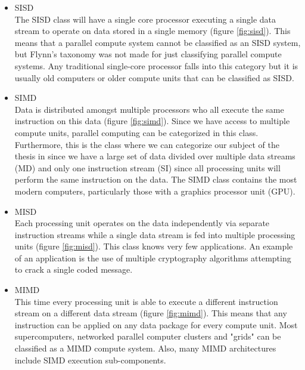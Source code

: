 \documentclass[a4paper, 11pt]{report}
\begin{document}
	\begin{itemize}
		\item SISD\\
		
The SISD class will have a single core processor executing a single data stream to operate on data stored in a single memory (figure \ref{fig:sisd}). This means that a parallel compute system cannot be classified as an SISD system, but Flynn's taxonomy was not made for just classifying parallel compute systems. Any traditional single-core processor falls into this category but it is usually old computers or older compute units that can be classified as SISD.
		\item {SIMD}\\
		
Data is distributed amongst multiple processors who all execute the same instruction on this data (figure \ref{fig:simd}). Since we have access to multiple compute units, parallel computing can be categorized in this class. Furthermore, this is the class where we can categorize our subject of the thesis in since we have a large set of data divided over multiple data streams (MD) and only one instruction stream (SI) since all processing units will perform the same instruction on the data. The SIMD class contains the most modern computers, particularly those with a graphics processor unit (GPU).
		\item MISD\\
		
Each processing unit operates on the data independently via separate instruction streams while a single data stream is fed into multiple processing units (figure \ref{fig:misd}). This class knows very few applications. An example of an application is the use of multiple cryptography algorithms attempting to crack a single coded message.
		\item MIMD\\
		
This time every processing unit is able to execute a different instruction stream on a different data stream (figure \ref{fig:mimd}). This means that any instruction can be applied on any data package for every compute unit. Most supercomputers, networked parallel computer clusters and "grids" can be classified as a MIMD compute system. Also, many MIMD architectures include SIMD execution sub-components.
		\end{itemize}
\end{document}

